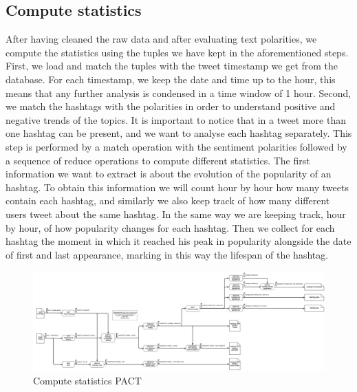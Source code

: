 \subsection{Compute statistics}
\label{sec:statistics}
After having cleaned the raw data and after evaluating text polarities, we compute the statistics using the tuples we have kept in the aforementioned steps. 
First, we load and match the tuples with the tweet timestamp we get from the database.
For each timestamp, we  keep the date and time up to the hour, this means that any further analysis is condensed in a time window of 1 hour.
Second, we match the hashtags with the polarities in order to understand positive and negative trends of the topics. 
It is important to notice that in a tweet more than one hashtag can be present, and we want to analyse each hashtag separately.
This step is performed by a match operation with the sentiment polarities followed by a sequence of reduce operations to compute different statistics.
The first information we want to extract is about the evolution of the popularity of an hashtag.
To obtain this information we will count hour by hour how many tweets contain each hashtag, and similarly we also keep track of how many different users tweet about the same hashtag.
In the same way we are keeping track, hour by hour, of how popularity changes for each hashtag.
Then we collect for each hashtag the moment in which it reached his peak in popularity alongside the date of first and last appearance, marking in this way the lifespan of the hashtag.



\begin{figure}[ht]
\includegraphics[width=\textwidth]{images/strato_pact_pt2.png} 
\caption{Compute statistics PACT}
\label{fig:statistics}
\end{figure}
